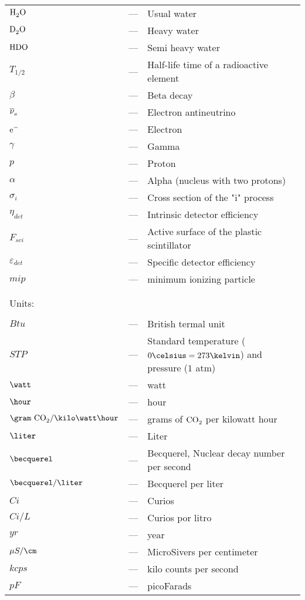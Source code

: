 \begin{longtable}{p{25mm} c p{120mm} }
$\ce{H_{2}O}$ & --- & Usual water\\
$\ce{D_{2}O}$ & --- & Heavy water\\
$\ce{HDO}$ & --- & Semi heavy water\\
$T_{1/2}$ & --- & Half-life time of a radioactive element\\
$\beta$ & --- & Beta decay\\
$\ce{\overline{\nu}_e}$ & --- & Electron antineutrino\\
$\ce{e^-}$ & --- & Electron\\
$\gamma$ & --- & Gamma\\
$p$ & --- & Proton\\
$\alpha$ & --- & Alpha (nucleus with two protons)\\
$\sigma_i$ & --- & Cross section of the "i" process\\
$\eta_{det}$ & --- & Intrinsic detector efficiency\\
$F_{sci}$ & --- & Active surface of the plastic scintillator\\
$\varepsilon_{det}$ & --- & Specific detector efficiency\\
$mip$ & --- & minimum ionizing particle\\

\\
\\

\multicolumn{3}{l}{Units:}\\
\\
$Btu$ & --- & British termal unit\\
$STP$ & --- & Standard temperature ($0\celsius=273\kelvin$) and pressure ($1$ atm)\\
$\watt$ & --- & watt\\
$\hour$ & --- & hour\\
$\gram~\ce{CO_2} /\kilo\watt\hour$ & --- & grams of $\ce{CO_2}$ per kilowatt hour\\
$\liter$ & --- & Liter\\
$\becquerel$ & --- & Becquerel, Nuclear decay number per second\\
$\becquerel/\liter$ & --- & Becquerel per liter\\
$Ci$ & --- & Curios\\
$Ci/L$ & --- & Curios por litro\\
$yr$ & --- & year\\
$\mu S/\cm$ & --- & MicroSivers per centimeter\\
$kcps$ & --- & kilo counts per second\\
$pF$ & --- & picoFarads\\



\end{longtable}
